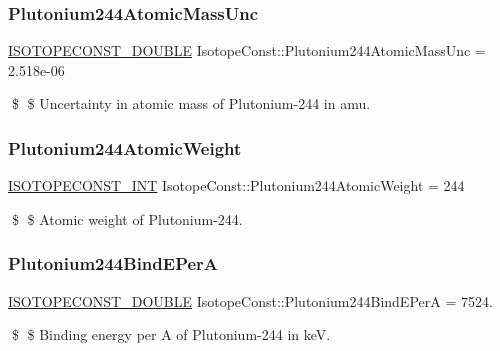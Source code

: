 \subsubsection{\texorpdfstring{Plutonium244\+Atomic\+Mass\+Unc}{Plutonium244AtomicMassUnc}}
{\footnotesize\ttfamily \mbox{\hyperlink{group___isotope_const-_macros_ga8f45a7272ce02c0b4c65c44636ed719a}{I\+S\+O\+T\+O\+P\+E\+C\+O\+N\+S\+T\+\_\+\+D\+O\+U\+B\+LE}} Isotope\+Const\+::\+Plutonium244\+Atomic\+Mass\+Unc = 2.\+518e-\/06}

\$ \$ Uncertainty in atomic mass of Plutonium-\/244 in amu. \mbox{\label{group___isotope_const-_plutonium-_pu244_ga065f95bb13a9b5dbdb73e11e9feccbb0}} 
\subsubsection{\texorpdfstring{Plutonium244\+Atomic\+Weight}{Plutonium244AtomicWeight}}
{\footnotesize\ttfamily \mbox{\hyperlink{group___isotope_const-_macros_ga5f18360b3e99483a35c32d789e62621c}{I\+S\+O\+T\+O\+P\+E\+C\+O\+N\+S\+T\+\_\+\+I\+NT}} Isotope\+Const\+::\+Plutonium244\+Atomic\+Weight = 244}

\$ \$ Atomic weight of Plutonium-\/244. \mbox{\label{group___isotope_const-_plutonium-_pu244_ga1490d8c895128144a92756ccc16c49f9}} 
\subsubsection{\texorpdfstring{Plutonium244\+Bind\+E\+PerA}{Plutonium244BindEPerA}}
{\footnotesize\ttfamily \mbox{\hyperlink{group___isotope_const-_macros_ga8f45a7272ce02c0b4c65c44636ed719a}{I\+S\+O\+T\+O\+P\+E\+C\+O\+N\+S\+T\+\_\+\+D\+O\+U\+B\+LE}} Isotope\+Const\+::\+Plutonium244\+Bind\+E\+PerA = 7524.}

\$ \$ Binding energy per A of Plutonium-\/244 in keV. \mbox{\label{group___isotope_const-_plutonium-_pu244_ga389186292ba17a4aff4c786432c0d9f5}} 
